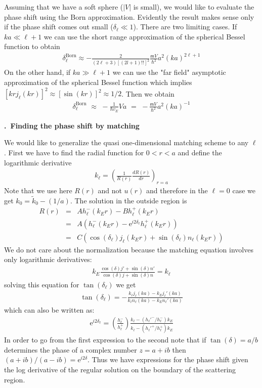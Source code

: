 \documentclass[onecolumn,fleqn, 11pt]{revtex4}
\newcommand{\eexp}{\mathrm{e}^}
\newcommand{\mass}{\mathsf{m}}
\newcommand{\tbox}[1]{\text{#1}}
\newcommand{\beq}{\begin{eqnarray}}
\newcommand{\eeq}{\end{eqnarray}}
\renewcommand{\thesubsection}{\arabic{subsection}}
\renewcommand{\thesubsubsection}{\arabic{subsubsection}}
\newcommand{\sheadC}[1]
{
\addtocounter{subsubsection}{1}
\vspace{5mm}
{\bf \thesubsection.\thesubsubsection \ #1}  
\nopagebreak
\phantomsection
}
\begin{document}
Assuming that we have a soft sphere ($|V|$ is small), 
we would  like to evaluate the phase shift using the Born approximation. 
Evidently the result makes sense only if the 
phase shift comes out small ($\delta_{\ell} \ll 1$). 
There are two limiting cases. 
If $ka \ll \ell{+}1$  we can use the short 
range approximation of the spherical Bessel 
function to obtain 
\beq
\delta^{\tbox{Born}}_{\ell}\approx
-\frac{2}{(2\ell+3)\left[(2l+1)!!\right]^2}
\frac{\mass V}{\hbar^2}a^2(ka)^{2\ell+1} 
\eeq
On the other hand, if $ka \gg \ell{+}1$ we can use 
the "far field" asymptotic approximation of 
the spherical Bessel function which implies 
$\left[ kr j_{\ell}(kr) \right ]^2 \approx [\sin(kr)]^2 \approx 1/2$. 
Then we obtain
\beq
\delta^{\tbox{Born}}_{\ell} \,\,\approx\,\,
-\frac{1}{\hbar v_E} V a \,\,=\,\,
-\frac{\mass V}{\hbar^2} a^2 (ka)^{-1}  
\eeq




\sheadC{Finding the phase shift by matching} 

We would like to generalize the quasi one-dimensional 
matching scheme to any $\ell$.  
First we have to find the radial function 
for $0<r<a$ and define the logarithmic derivative  
\beq
k_{\ell} = \left(\frac{1}{R(r)}\frac{dR(r)}{dr}\right)_{r=a}
\eeq
Note that we use here $R(r)$ and not $u(r)$ 
and therefore in the $\ell=0$ case we
get ${k_0=\tilde{k}_0-(1/a)}$. The solution in 
the outside region is
\beq
R(r) &=& A h_{\ell}^{-}(k_E r) - B h_{\ell}^{+}(k_E r) 
\\ \nonumber
&=&  A( h_{\ell}^{-}(k_E r) - \eexp{i2\delta_{\ell}} h_{\ell}^{+}(k_E r) ) 
\\ \nonumber
&=& C (\cos(\delta_{\ell})j_{\ell}(k_Er) + \sin(\delta_{\ell})n_{\ell}(k_Er)) 
\eeq
We do not care about the normalization because 
the matching equation involves only logarithmic derivatives:
\beq
k_E\frac{\cos(\delta)j'+\sin(\delta)n'}{\cos(\delta)j+\sin(\delta)n}=k_{\ell}
\eeq
solving this equation for $\tan(\delta_{\ell})$ we get
\beq
\tan(\delta_{\ell})
=-\frac{k_{\ell}j_{\ell}(ka)-k_E j_{\ell}'(ka)}{k_{\ell} n_{\ell} (ka) -k_E n_{\ell}'(ka)}
\eeq
which can also be written as:
\beq
\eexp{i2\delta_{\ell}} = 
\left( \frac{h_{\ell}^{-}}{h_{\ell}^{+}} \right) 
\frac
{ k_{\ell} - ( h_{\ell}'^{-} / h_{\ell}^{-} ) k_E}
{ k_{\ell} - ( h_{\ell}'^{+} / h_{\ell}^{+} ) k_E}
\eeq
In order to go from the first expression to the second 
note that if ${\tan(\delta)=a/b}$ determines 
the phase of a complex number ${z=a+ib}$   
then ${(a+ib)/(a-ib)=\eexp{i2\delta}}$. 
Thus we have expressions for the phase shift given 
the log derivative of the regular solution on the 
boundary of the scattering region.
\end{document}
